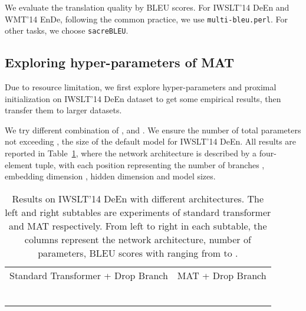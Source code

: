 \documentclass{article}
\begin{document}
 We evaluate the translation quality by BLEU scores. For IWSLT'14 DeEn and WMT'14 EnDe, following the common practice, we use \texttt{multi-bleu.perl}. For other tasks, we choose \texttt{sacreBLEU}.  




\subsection{Exploring hyper-parameters of MAT}\label{sec:hyper_explore}
Due to resource limitation, we first explore hyper-parameters and proximal initialization on IWSLT'14 DeEn dataset to get some empirical results, then transfer them to larger datasets.

We try different combination of ,  and . We ensure the number of total parameters not exceeding , the size of the default model for IWSLT'14 DeEn. All results are reported in Table~\ref{tab:iwslt_deen_multi-branch_attn}, where the network architecture is described by a four-element tuple, with each position representing the number of branches , embedding dimension , hidden dimension  and model sizes.

\begin{table}[!htbp]
\vspace{-1mm}
\centering
\small
\caption{Results on IWSLT'14 DeEn with different architectures. The left and right subtables are experiments of standard transformer and MAT respectively. From left to right in each subtable, the columns represent the network architecture, number of parameters, BLEU scores with  ranging from  to .}
\begin{tabular}{p{2.44cm}p{.62cm}p{.56cm}p{.56cm}p{.56cm}|p{2.44cm}p{.56cm}p{.56cm}p{.56cm}p{.56cm}}
\toprule
 &  &  &  &  &  &  &  &  &  \\
\midrule
\multicolumn{5}{c|}{Standard Transformer + Drop Branch} & \multicolumn{5}{c}{MAT + Drop Branch} \\ 
\midrule
 &     &  &     &    &  &     &  &  &  \\
 &	 &	 &	 &	 &  &     &  &  &  \\
 &	 &	 &    &	 &  &     &  &	 &	 \\
 & 	 &	 &	 &	 &  &     &  &	 &	 \\
 & & & & &  & 	 &	 &  &	 \\
 & & & & &  & 	 &	 &	 &	 \\
\bottomrule
\end{tabular}
\label{tab:iwslt_deen_multi-branch_attn}
\vspace{-1mm}
\end{table}
\end{document}
